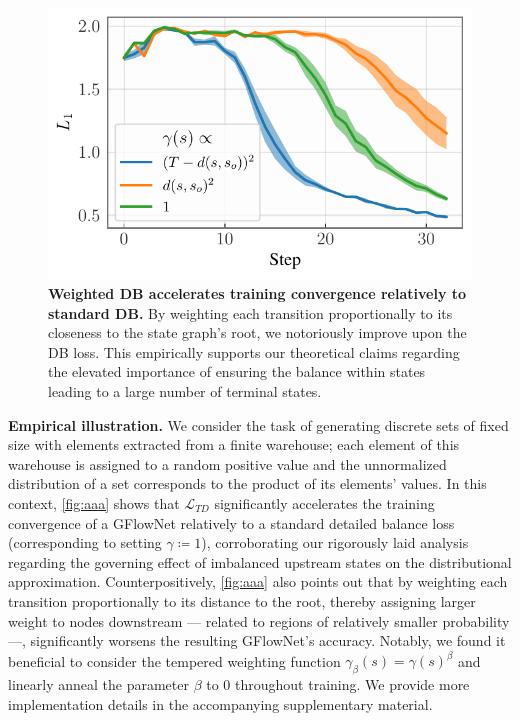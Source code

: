 \begin{figure}[!t] 
    \centering
    \includegraphics[width=.45\linewidth]{figures/avg_l1_gflownets_sets_weighted_db.pdf}
    \caption{\textbf{Weighted DB accelerates training convergence relatively to standard DB.} By weighting each transition proportionally to its closeness to the state graph's root, we notoriously improve upon the DB loss. This empirically supports our theoretical claims regarding the elevated importance of ensuring the balance within states leading to a large number of terminal states.}
    \label{fig:aaa}
\end{figure}

\vspace{4pt}\noindent\textbf{Empirical illustration.} 
We consider the task of generating discrete sets of fixed size with elements extracted from a finite warehouse; each element of this warehouse is assigned to a random positive value and the unnormalized distribution of a set corresponds to the product of its elements' values. 
In this context, \autoref{fig:aaa} shows that $\mathcal{L}_{TD}$ significantly accelerates the training convergence of a GFlowNet relatively to a standard detailed balance loss (corresponding to setting $\gamma \coloneqq 1$), corroborating our rigorously laid analysis regarding the governing effect of imbalanced upstream states on the distributional approximation. Counterpositively, \autoref{fig:aaa} also points out that by weighting each transition proportionally to its distance to the root, thereby assigning larger weight to nodes downstream --- related to regions of relatively smaller probability ---, significantly worsens the resulting GFlowNet's accuracy. Notably, we found it beneficial to consider the tempered weighting function $\gamma_{\beta}(s) = \gamma(s)^{\beta}$ and linearly anneal the parameter $\beta$ to $0$ throughout training. We provide more implementation details in the accompanying supplementary material.  
